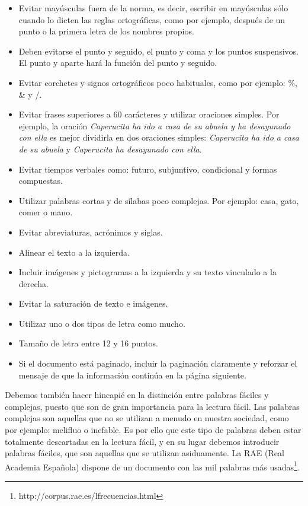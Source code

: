 \begin{itemize}
	\item Evitar mayúsculas fuera de la norma, es decir, escribir en mayúsculas sólo cuando lo dicten las reglas ortográficas, como por ejemplo, después de un punto o la primera letra de los nombres propios.
	\item Deben evitarse el punto y seguido, el punto y coma y los puntos suspensivos. El punto y aparte hará la función del punto y seguido.
	\item Evitar corchetes y signos ortográficos poco habituales, como por ejemplo: \%, \& y /.
	\item Evitar frases superiores a 60 carácteres y utilizar oraciones simples. Por ejemplo, la oración \textit{Caperucita ha ido a casa de su abuela y ha desayunado con ella} es mejor dividirla en dos oraciones simples:\textit{ Caperucita ha ido a casa de su abuela} y  \textit{Caperucita ha desayunado con ella}.
	\item Evitar tiempos verbales como: futuro, subjuntivo, condicional y formas compuestas.
	\item Utilizar palabras cortas y de sílabas poco complejas. 
	Por ejemplo: casa, gato, comer o mano.
	\item Evitar abreviaturas, acrónimos y siglas.
	\item Alinear el texto a la izquierda.
	\item Incluir imágenes y pictogramas a la izquierda y su texto vinculado a la derecha.
	\item Evitar la saturación de texto e imágenes.
	\item Utilizar uno o dos tipos de letra como mucho.
	\item Tamaño de letra entre 12 y 16 puntos.
	\item Si el documento está paginado, incluir la paginación claramente y reforzar el mensaje de que la información continúa en la página siguiente.
\end{itemize}

Debemos también hacer hincapié en la distinción entre palabras fáciles y complejas, puesto que son de gran importancia para la lectura fácil. 
Las palabras complejas son aquellas que no se utilizan a menudo en nuestra sociedad, como por ejemplo: melifluo o inefable. Es por ello que este tipo de palabras deben estar totalmente descartadas en la lectura fácil, y en su lugar debemos introducir palabras fáciles, que son aquellas que se utilizan asiduamente. La RAE (Real Academia Española) dispone de un documento con las mil palabras más usadas\footnote{http://corpus.rae.es/lfrecuencias.html}.

